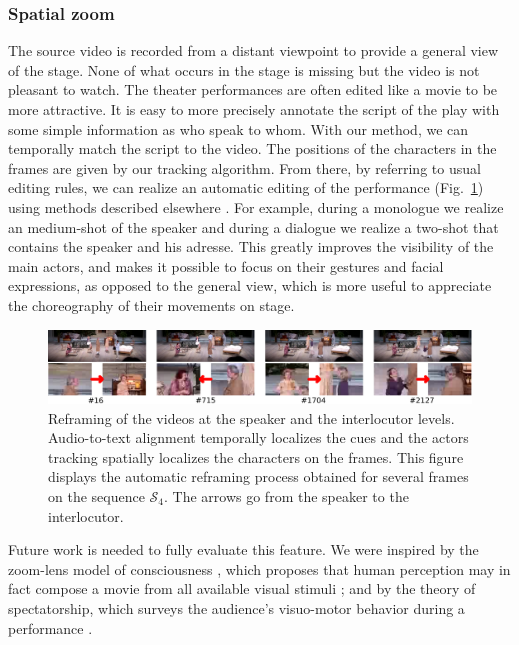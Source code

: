 \documentclass[conference]{IEEEtran}
\begin{document}
\subsubsection{Spatial zoom}
The source video  is recorded from a distant viewpoint  to provide  a general  view of the stage.  None of what occurs in the stage is missing but the video is not pleasant to watch.  The theater performances are often edited like a movie to be more attractive.   It is easy to more precisely annotate the script of the play with some simple information as who speak to whom. With our method, we can temporally match the script to the video.  The positions of the characters in the frames are given by our tracking algorithm.  From there, by referring to usual editing rules, we can realize an automatic editing of the performance (Fig.~\ref{fig_speaker}) using methods described elsewhere \cite{Gandhi14}.  For example, during a monologue we realize an medium-shot of the speaker and during a dialogue we realize a two-shot that contains the speaker and his adresse. This greatly improves the visibility of the main actors, and makes it possible to focus on their gestures and facial expressions, as opposed to the general view, which is more useful to appreciate the choreography of their movements on stage.

\begin{figure}[tp]
\centering
\includegraphics[width=\textwidth]{speakers2}
\caption{Reframing of the videos at the speaker and the interlocutor levels. Audio-to-text alignment temporally localizes the cues and the actors tracking spatially localizes the characters on the frames. 
This figure displays the automatic reframing process obtained for several frames on the sequence $\mathcal{S}_4$. The arrows go from the speaker to the interlocutor.}
\label{fig_speaker}
\end{figure}


Future work is needed to fully evaluate this feature. We were inspired by the zoom-lens model of consciousness \cite{Eriksen86}, 
which proposes  that human perception  may in fact compose a movie from all available visual  stimuli  ; and by the theory 
of spectatorship, which surveys the audience's visuo-motor behavior  during a performance \cite{Bennett97}.   
\end{document}
